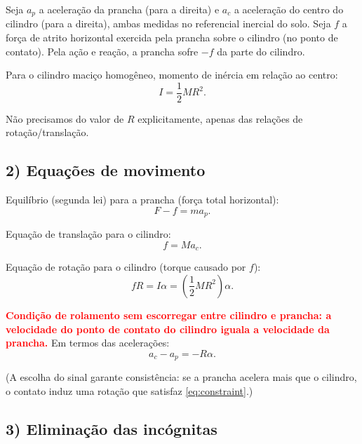 \documentclass[a4paper,12pt]{article}
\begin{document}
\begin{flushleft}
Seja $a_p$ a aceleração da prancha (para a direita) e $a_c$ a aceleração do centro do cilindro (para a direita),
ambas medidas no referencial inercial do solo. Seja $f$ a força de atrito horizontal exercida pela prancha sobre o cilindro
(no ponto de contato). Pela ação e reação, a prancha sofre $-f$ da parte do cilindro.

Para o \colorbox{yellow!30}{cilindro maciço homogêneo, momento de inércia em relação ao centro:}
\begin{equation}\label{eq:I}
\boxed{
I=\frac{1}{2}MR^{2}.
}
\end{equation}

Não precisamos do valor de $R$ explicitamente, apenas das relações de rotação/translação.

\subsection*{2) Equações de movimento}

Equilíbrio (segunda lei) para a prancha (força total horizontal):
\begin{equation}\label{eq:plank}
F - f = m a_p .
\end{equation}

Equação de translação para o cilindro:
\begin{equation}\label{eq:cyl_trans}
f = M a_c .
\end{equation}

Equação de rotação para o cilindro (torque causado por $f$):
\begin{equation}\label{eq:cyl_rot}
fR = I \alpha = \left(\frac{1}{2}MR^{2}\right)\alpha.
\end{equation}

\textbf{\textcolor{red}{Condição de rolamento sem escorregar entre cilindro e prancha:
a velocidade do ponto de contato do cilindro iguala a velocidade da prancha.}} Em termos das acelerações:
\begin{equation}\label{eq:constraint}
a_c - a_p = -R\alpha.
\end{equation}

(A escolha do sinal garante consistência: se a prancha acelera mais que o cilindro, o contato induz uma rotação que satisfaz \eqref{eq:constraint}.)

\subsection*{3) Eliminação das incógnitas}


\end{flushleft}
\end{document}
